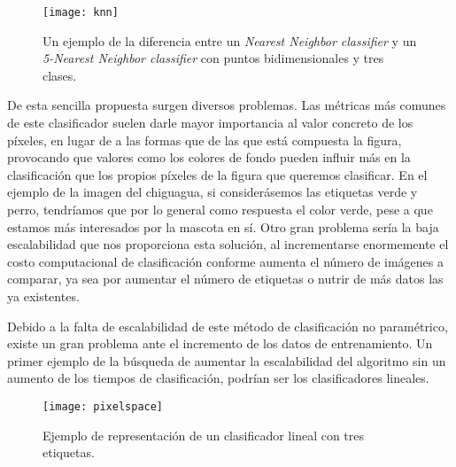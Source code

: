 \begin{figure}[htpb]
  \centering
  \texttt{[image: knn]}
  \caption{Un ejemplo de la diferencia entre un \emph{Nearest Neighbor classifier} y un \emph{5-Nearest Neighbor classifier} con puntos bidimensionales y tres clases.\cite{stanford}}
  \label{fig:knn}
\end{figure}

De esta sencilla propuesta surgen diversos problemas. Las métricas más comunes de este clasificador suelen darle mayor importancia al valor concreto de los píxeles, en lugar de a las formas que de las que está compuesta la figura, provocando que valores como los colores de fondo pueden influir más en la clasificación que los propios píxeles de la figura que queremos clasificar. En el ejemplo de la imagen del chiguagua, si considerásemos las etiquetas verde y perro, tendríamos que por lo general como respuesta el color verde, pese a que estamos más interesados por la mascota en sí. Otro gran problema sería la baja escalabilidad que nos proporciona esta solución, al incrementarse enormemente el costo computacional de clasificación conforme aumenta el número de imágenes a comparar, ya sea por aumentar el número de etiquetas o nutrir de más datos las ya existentes.\newline


Debido a la falta de escalabilidad de este método de clasificación no paramétrico, existe un gran problema ante el incremento de los datos de entrenamiento. Un primer ejemplo de la búsqueda de aumentar la escalabilidad del algoritmo sin un aumento de los tiempos de clasificación, podrían ser los clasificadores lineales.\\

\begin{figure}[htpb]
  \centering
  \texttt{[image: pixelspace]}
  \caption{Ejemplo de representación de un clasificador lineal con tres etiquetas.\cite{stanford}}
  \label{fig:pixelspace}
\end{figure}

